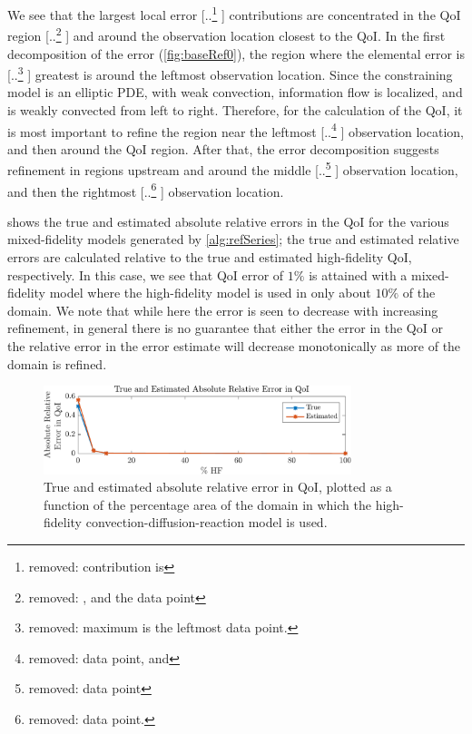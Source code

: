 \documentclass[review]{siamart0516}
\providecommand{\DIFaddtex}[1]{{\protect\color{blue} \sf #1}} %
\providecommand{\DIFdeltex}[1]{{\protect\color{red} [..\footnote{removed: #1} ]}} %
\providecommand{\DIFaddbegin}{} %
\providecommand{\DIFaddend}{} %
\providecommand{\DIFdelbegin}{} %
\providecommand{\DIFdelend}{} %
\providecommand{\DIFadd}[1]{\texorpdfstring{\DIFaddtex{#1}}{#1}} %
\providecommand{\DIFdel}[1]{\texorpdfstring{\DIFdeltex{#1}}{}} %
\newcommand{\DIFscaledelfig}{0.5}
\newlength{\DIFdelgraphicswidth} %
\newlength{\DIFdelgraphicsheight} %
\newcommand{\DIFaddincludegraphics}[2][]{{\color{blue}\fbox{\DIFOincludegraphics[#1]{#2}}}} %
\newcommand{\DIFdelincludegraphics}[2][]{%
\sbox{\DIFdelgraphicsbox}{\DIFOincludegraphics[#1]{#2}}%
\settoboxwidth{\DIFdelgraphicswidth}{\DIFdelgraphicsbox} %
\settoboxtotalheight{\DIFdelgraphicsheight}{\DIFdelgraphicsbox} %
\scalebox{\DIFscaledelfig}{%
\parbox[b]{\DIFdelgraphicswidth}{\usebox{\DIFdelgraphicsbox}\\[-\baselineskip] \rule{\DIFdelgraphicswidth}{0em}}\llap{\resizebox{\DIFdelgraphicswidth}{\DIFdelgraphicsheight}{%
\setlength{\unitlength}{\DIFdelgraphicswidth}%
\begin{picture}(1,1)%
\thicklines\linethickness{2pt} %
{\color[rgb]{1,0,0}\put(0,0){\framebox(1,1){}}}%
{\color[rgb]{1,0,0}\put(0,0){\line( 1,1){1}}}%
{\color[rgb]{1,0,0}\put(0,1){\line(1,-1){1}}}%
\end{picture}%
}\hspace*{3pt}}} %
} %
\DeclareRobustCommand{\DIFaddbegin}{\DIFOaddbegin \let\includegraphics\DIFaddincludegraphics} %
\DeclareRobustCommand{\DIFaddend}{\DIFOaddend \let\includegraphics\DIFOincludegraphics} %
\DeclareRobustCommand{\DIFdelbegin}{\DIFOdelbegin \let\includegraphics\DIFdelincludegraphics} %
\DeclareRobustCommand{\DIFdelend}{\DIFOaddend \let\includegraphics\DIFOincludegraphics} %
\begin{document}
We see that the largest local error \DIFdelbegin \DIFdel{contribution is }\DIFdelend \DIFaddbegin \DIFadd{contributions are }\DIFaddend concentrated in the QoI region \DIFdelbegin \DIFdel{, and the data point }\DIFdelend \DIFaddbegin \DIFadd{and around the observation location }\DIFaddend closest to the QoI. %
In the first decomposition of the error (\cref{fig:baseRef0}), the region where the elemental error is \DIFdelbegin \DIFdel{maximum is the leftmost data point. %
}\DIFdelend \DIFaddbegin \DIFadd{greatest is around the leftmost observation location. }\DIFaddend Since the constraining model is an elliptic PDE, with weak convection, information flow is localized, and is weakly convected from left to right. Therefore, for the calculation of the QoI, it is most important to refine the region near the leftmost \DIFdelbegin \DIFdel{data point, and }\DIFdelend \DIFaddbegin \DIFadd{observation location, and then around }\DIFaddend the QoI region. %
After that, the error decomposition suggests refinement in regions upstream and around the middle \DIFdelbegin \DIFdel{data point}\DIFdelend \DIFaddbegin \DIFadd{observation location}\DIFaddend , and then the rightmost \DIFdelbegin \DIFdel{data point.
}\DIFdelend \DIFaddbegin \DIFadd{observation location.
}\DIFaddend 

 shows the true and estimated absolute relative errors in the QoI for the various mixed-fidelity models generated by \cref{alg:refSeries}; the true and estimated relative errors are calculated relative to the true and estimated high-fidelity QoI, respectively. In this case, we see that QoI error of $1\%$ is attained with a mixed-fidelity model where the high-fidelity model is used in only about $10\%$ of the domain. We note that while here the error is seen to decrease with increasing refinement, in general there is no guarantee that either the error in the QoI or the relative error in the error estimate will decrease monotonically as more of the domain is refined.
%
\begin{figure}[htbp]
\centering
\includegraphics[width=0.8\textwidth]{baseSeries/err_est.pdf}
\caption{True and estimated absolute relative error in QoI, plotted as a function of the percentage area of the domain in which the high-fidelity convection-diffusion-reaction model is used.}
\label{fig:baseErr}
\end{figure}
%
\end{document}
